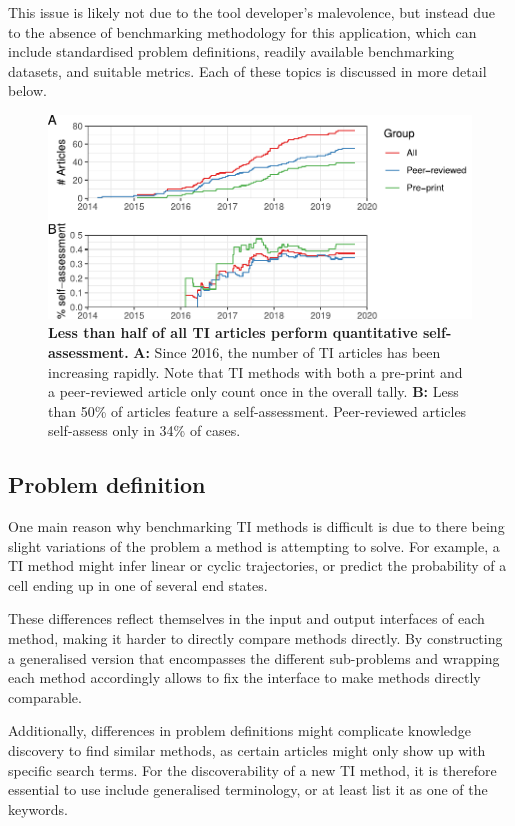 This issue is likely not due to the tool developer's malevolence, but instead due to the absence of benchmarking methodology for this application, which can include standardised problem definitions, readily available benchmarking datasets, and suitable metrics.
Each of these topics is discussed in more detail below.

\begin{figure}[htb!]
	\centering
	\includegraphics[width=.75\linewidth]{fig/selfassessment/self_assessment_edited.pdf}
	\caption{
		\textbf{Less than half of all TI articles perform quantitative self-assessment.}
		\textbf{A:} Since 2016, the number of TI articles has been increasing rapidly. Note that TI methods with both a pre-print and a peer-reviewed article only count once in the overall tally.
		\textbf{B:} Less than 50\% of articles feature a self-assessment. Peer-reviewed articles self-assess only in 34\% of cases.
	}
	\label{fig:benchmarks_over_time}
\end{figure}

\subsection{Problem definition} 
One main reason why benchmarking TI methods is difficult is due to there being slight variations of the problem a method is attempting to solve. For example, a TI method might infer linear or cyclic trajectories, or predict the probability of a cell ending up in one of several end states.

These differences reflect themselves in the input and output interfaces of each method, making it harder to directly compare methods directly. By constructing a generalised version that encompasses the different sub-problems and wrapping each method accordingly allows to fix the interface to make methods directly comparable.

Additionally, differences in problem definitions might complicate knowledge discovery to find similar methods, as certain articles might only show up with specific search terms. For the discoverability of a new TI method, it is therefore essential to use include generalised terminology, or at least list it as one of the keywords.

